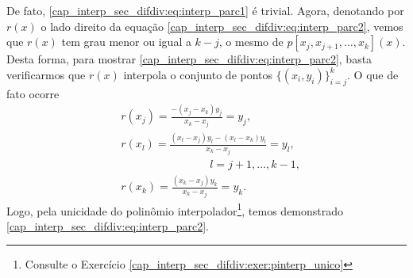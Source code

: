 De fato, \eqref{cap_interp_sec_difdiv:eq:interp_parc1} é trivial. Agora, denotando por $r(x)$ o lado direito da equação \eqref{cap_interp_sec_difdiv:eq:interp_parc2}, vemos que $r(x)$ tem grau menor ou igual a $k-j$, o mesmo de $p[x_j, x_{j+1}, \ldots, x_k](x)$. Desta forma, para mostrar \eqref{cap_interp_sec_difdiv:eq:interp_parc2}, basta verificarmos que $r(x)$ interpola o conjunto de pontos $\{(x_i, y_i)\}_{i=j}^k$. O que de fato ocorre
\begin{subequations}
  \begin{align}
    &r(x_j) = \frac{-(x_j-x_k)y_j}{x_k-x_j} = y_j,\\
    &r(x_{l}) = \frac{(x_l-x_j)y_l-(x_l-x_k)y_l}{x_k-x_j}=y_l,\nonumber\\
    &\qquad\qquad\qquad\qquad l=j+1,\dotsc,k-1,\\
    &r(x_k) = \frac{(x_k-x_j)y_k}{x_k-x_j}=y_k.
  \end{align}
\end{subequations}
Logo, pela unicidade do polinômio interpolador\footnote{Consulte o Exercício \ref{cap_interp_sec_difdiv:exer:pinterp_unico}}, temos demonstrado \eqref{cap_interp_sec_difdiv:eq:interp_parc2}.

